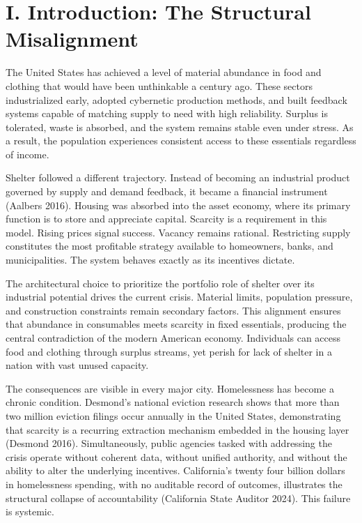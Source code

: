 \documentclass[
  12pt,
]{article}
\begin{document}
\hypertarget{i.-introduction-the-structural-misalignment}{%
\section{I. Introduction: The Structural Misalignment}\label{i.-introduction-the-structural-misalignment}}

The United States has achieved a level of material abundance in food and clothing that would have been unthinkable a century ago. These sectors industrialized early, adopted cybernetic production methods, and built feedback systems capable of matching supply to need with high reliability. Surplus is tolerated, waste is absorbed, and the system remains stable even under stress. As a result, the population experiences consistent access to these essentials regardless of income.

Shelter followed a different trajectory. Instead of becoming an industrial product governed by supply and demand feedback, it became a financial instrument (Aalbers 2016). Housing was absorbed into the asset economy, where its primary function is to store and appreciate capital. Scarcity is a requirement in this model. Rising prices signal success. Vacancy remains rational. Restricting supply constitutes the most profitable strategy available to homeowners, banks, and municipalities. The system behaves exactly as its incentives dictate.

The architectural choice to prioritize the portfolio role of shelter over its industrial potential drives the current crisis. Material limits, population pressure, and construction constraints remain secondary factors. This alignment ensures that abundance in consumables meets scarcity in fixed essentials, producing the central contradiction of the modern American economy. Individuals can access food and clothing through surplus streams, yet perish for lack of shelter in a nation with vast unused capacity.

The consequences are visible in every major city. Homelessness has become a chronic condition. Desmond's national eviction research shows that more than two million eviction filings occur annually in the United States, demonstrating that scarcity is a recurring extraction mechanism embedded in the housing layer (Desmond 2016). Simultaneously, public agencies tasked with addressing the crisis operate without coherent data, without unified authority, and without the ability to alter the underlying incentives. California's twenty four billion dollars in homelessness spending, with no auditable record of outcomes, illustrates the structural collapse of accountability (California State Auditor 2024). This failure is systemic.
\end{document}
